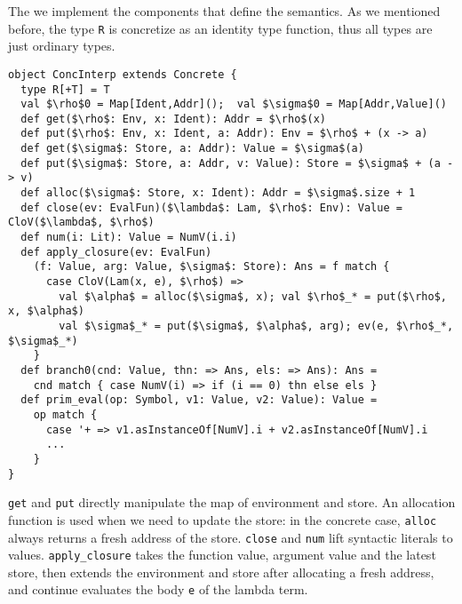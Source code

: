 The we implement the components that define the semantics. 
As we mentioned before, the type \texttt{R} is concretize as an identity type function, thus
all types are just ordinary types.

\begin{lstlisting}
object ConcInterp extends Concrete {
  type R[+T] = T
  val $\rho$0 = Map[Ident,Addr]();  val $\sigma$0 = Map[Addr,Value]()
  def get($\rho$: Env, x: Ident): Addr = $\rho$(x)
  def put($\rho$: Env, x: Ident, a: Addr): Env = $\rho$ + (x -> a)
  def get($\sigma$: Store, a: Addr): Value = $\sigma$(a)
  def put($\sigma$: Store, a: Addr, v: Value): Store = $\sigma$ + (a -> v)
  def alloc($\sigma$: Store, x: Ident): Addr = $\sigma$.size + 1
  def close(ev: EvalFun)($\lambda$: Lam, $\rho$: Env): Value = CloV($\lambda$, $\rho$)
  def num(i: Lit): Value = NumV(i.i)
  def apply_closure(ev: EvalFun)
    (f: Value, arg: Value, $\sigma$: Store): Ans = f match {
      case CloV(Lam(x, e), $\rho$) =>
        val $\alpha$ = alloc($\sigma$, x); val $\rho$_* = put($\rho$, x, $\alpha$)
        val $\sigma$_* = put($\sigma$, $\alpha$, arg); ev(e, $\rho$_*, $\sigma$_*)
    }
  def branch0(cnd: Value, thn: => Ans, els: => Ans): Ans = 
    cnd match { case NumV(i) => if (i == 0) thn else els }
  def prim_eval(op: Symbol, v1: Value, v2: Value): Value = 
    op match {
      case '+ => v1.asInstanceOf[NumV].i + v2.asInstanceOf[NumV].i
      ...
    }
}
\end{lstlisting}

\texttt{get} and \texttt{put} directly manipulate the map of environment and store. 
An allocation function is used when we need to update the store: 
in the concrete case, \texttt{alloc} always returns a fresh address of the store.
\texttt{close} and \texttt{num} lift syntactic literals to values.
\texttt{apply\_closure} takes the function value, argument value and the latest store,
then extends the environment and store after allocating a fresh address, and continue
evaluates the body \texttt{e} of the lambda term.

